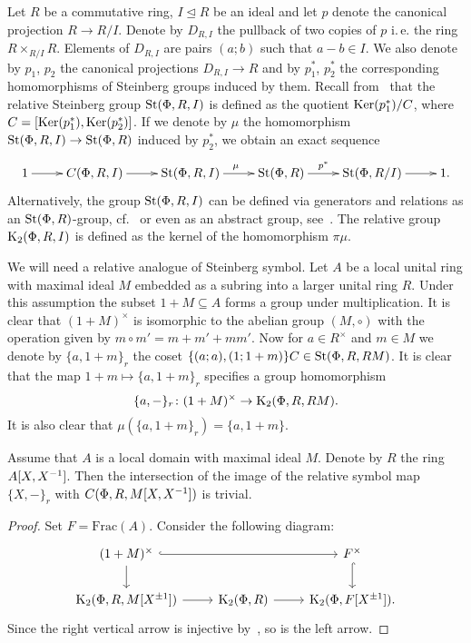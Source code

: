 Let $R$ be a commutative ring, $I \trianglelefteq R$ be an ideal and let $p$ denote the canonical projection $R \to R/I$.
Denote by $D_{R, I}$ the pullback of two copies of $p$ i.\,e. the ring $R \times_{R/I} R$.
Elements of $D_{R, I}$ are pairs $(a; b)$ such that $a-b \in I$.
We also denote by $p_1$, $p_2$ the canonical projections $D_{R, I} \to R$ and by $p_1^*$, $p_2^*$ the corresponding homomorphisms of Steinberg groups induced by them.
Recall from~\cite[Definition~2.5]{LS20} that the relative Steinberg group $\operatorname{St}(\Phi, R, I)$ is defined as the quotient
 $\operatorname{Ker}(p_1^*) / C$, where $C = [\operatorname{Ker}(p_1^*), \operatorname{Ker}(p_2^*)]$.
If we denote by $\mu$ the homomorphism $\operatorname{St}(\Phi, R, I) \to \operatorname{St}(\Phi, R)$ induced by $p_2^*$, we obtain an exact sequence
\begin{equation}
    \xymatrix{1 \ar[r] & C(\Phi, R, I) \ar[r] & \St(\Phi, R, I) \ar[r]^\mu & \St(\Phi, R) \ar[r]^-{p^*} & \St(\Phi, R/I) \ar[r] & 1. }\label{eq:relative-Steinberg}
\end{equation}
Alternatively, the group $\operatorname{St}(\Phi, R, I)$ can be defined via generators and relations as an $\operatorname{St}(\Phi, R)$-group, cf.~\cite[Proposition~6]{S15}
 or even as an abstract group, see~\cite{V22}.
The relative group $\operatorname{K}_2(\Phi, R, I)$ is defined as the kernel of the homomorphism $\pi \mu$.

We will need a relative analogue of Steinberg symbol.
Let $A$ be a local unital ring with maximal ideal $M$ embedded as a subring into a larger unital ring $R$.
Under this assumption the subset $1+M \subseteq A$ forms a group under multiplication.
It is clear that $(1+M)^\times$ is isomorphic to the abelian group $(M, \circ)$ with the operation given by $m \circ m' = m + m' + mm'$.
Now for $a \in R^\times$ and $m \in M$ we denote by $\{a, 1+m\}_r$ the coset $\{(a; a), (1; 1+m)\}C \in \operatorname{St}(\Phi, R, RM)$.
It is clear that the map $1+m \mapsto \{a, 1+m\}_r$ specifies a group homomorphism
\begin{equation} \label{eq:relative-symbol} \{ a, -\}_r \colon (1+M)^\times \to \operatorname{K}_2(\Phi, R, RM). \end{equation}
It is also clear that $\mu(\{a, 1+m\}_r) = \{a, 1+m\}$.

\begin{lemma}\label{lem:symbols}
Assume that $A$ is a local domain with maximal ideal $M$.
Denote by $R$ the ring $A[X, X^{-1}]$.
Then the intersection of the image of the relative symbol map $\{X, -\}_r$ with $C(\Phi, R, M[X, X^{-1}])$ is trivial.
\end{lemma}
\begin{proof}
Set $F = \mathrm{Frac}(A)$.
Consider the following diagram:
\[\begin{tikzcd}
 (1+M)^\times \ar[hookrightarrow, rr] \ar[d] &  & F^\times \ar[hookrightarrow, d] \\
  \K_2(\Phi ,R, M[X^{\pm 1}]) \ar[r] & \K_2(\Phi, R) \ar[r] & \K_2(\Phi, F[X^{\pm 1}]).
\end{tikzcd}\]
Since the right vertical arrow is injective by~\cite[Lemma~2.2]{LS20}, so is the left arrow.
\end{proof}

